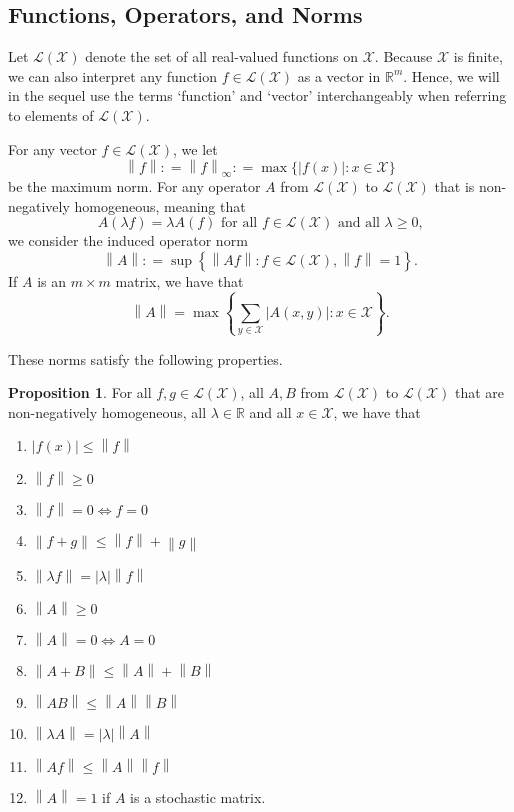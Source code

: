 \documentclass[10pt]{paper}
\theoremstyle{definition}
\newtheorem{proposition}[theorem]{Proposition}
\newcommand{\reals}{\mathbb{R}}
\newcommand{\states}{\mathcal{X}}
\newcommand{\gambles}{\mathcal{L}}
\newcommand{\gamblesX}{\gambles(\states)}
\newcommand{\asa}{\Leftrightarrow}
\newcommand{\norm}[1]{\left\lVert #1 \right\rVert}
\newcommand{\abs}[1]{\left\vert #1 \right\vert}
\newcommand{\coloneqq}{:\!=}
\begin{document}
\subsection{Functions, Operators, and Norms}
Let $\gamblesX$ denote the set of all real-valued functions on $\states$. Because $\states$ is finite, we can also interpret any function $f\in\gamblesX$ as a vector in $\reals^m$. Hence, we will in the sequel use the terms `function' and `vector' interchangeably when referring to elements of $\gamblesX$.

For any vector $f\in\gamblesX$, we let
\begin{equation*}
\norm{f}\coloneqq\norm{f}_{\infty}\coloneqq\max\{\abs {f(x)}\colon x\in\states\}
\end{equation*}
be the maximum norm. For any operator $A$ from $\gamblesX$ to $\gamblesX$ that is non-negatively homogeneous, meaning that
\begin{equation*}
A(\lambda f)=\lambda A(f)\text{ for all $f\in\gamblesX$ and all $\lambda\geq0$,}
\end{equation*}
we consider the induced operator norm
\begin{equation*}
\norm{A}\coloneqq\sup\left\{\norm{Af}\colon f\in\gamblesX,\norm{f}=1\right\}.
\end{equation*}
If $A$ is an $m\times m$ matrix, we have that
\begin{equation*}
\norm{A}
=
\max\left\{\sum_{y\in\states}\abs{A(x,y)}\colon x\in\states\right\}.
\end{equation*}

\noindent
These norms satisfy the following properties. 

\begin{proposition}
For all $f,g\in\gamblesX$, all $A,B$ from $\gamblesX$ to $\gamblesX$ that are non-negatively homogeneous, all $\lambda\in\reals$ and all $x\in\states$, we have that
\vspace{5pt}

\begin{enumerate}[label=N\arabic*:,ref=N\arabic*]
\item
$\abs{f(x)}\leq\norm{f}$
\item
$\norm{f}\geq0$
\item
$\norm{f}=0\asa f=0$
\item
$\norm{f+g}\leq\norm{f}+\norm{g}$
\item
$\norm{\lambda f}=\abs{\lambda}\norm{f}$
\item
$\norm{A}\geq0$
\item
$\norm{A}=0\asa A=0$
\item
$\norm{A+B}\leq\norm{A}+\norm{B}$
\item
$\norm{AB}\leq\norm{A}\norm{B}$
\item
$\norm{\lambda A}=\abs{\lambda}\norm{A}$
\item\label{N:normAf}
$\norm{Af}\leq\norm{A}\norm{f}$
\item
$\norm{A}=1$ if $A$ is a stochastic matrix.
\end{enumerate}
\vspace{5pt}
\end{proposition}
\end{document}
